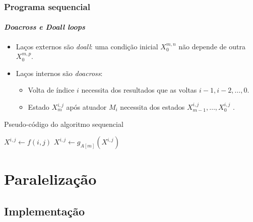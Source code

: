 \documentclass[10pt]{beamer}
\begin{document}
\begin{frame}
\frametitle{Programa sequencial}
\framesubtitle{\textit{Doacross e Doall loops}}

\begin{itemize}
  \item Laços externos são \textit{doall}: uma condição inicial \(X_0^{m,n}\)
  não depende de outra \(X_0^{m,p}\).
  \item Laços internos são \textit{doacross}: 
  \begin {itemize}
    \item Volta de índice \(i\) necessita dos resultados que as voltas \(i
    - 1, i - 2, \ldots, 0\).
	\item Estado \(X_{m}^{i,j}\) após atuador \(M_i\) necessita dos
	estados  \(X_{m-1}^{i,j}, \ldots, X_{0}^{i,j} \) .
	\end{itemize} 
\end{itemize}

\vspace{-12pt}

\begin{algorithm}[H]
\caption{Pseudo-código do algoritmo sequencial} 
\begin{algorithmic}[1]
	    \State ${X^{i,j}} \gets f(i,j) $ 
	     
	          
	        \State $X^{i,j} \gets g_{A[m]} (X^{i,j})$
	    	\EndFor
	    \EndFor
	\EndFor
   \EndFunction
\end{algorithmic}
\end{algorithm}

\end{frame}

\section{Paralelização}
\subsection{Implementação}
\end{document}
